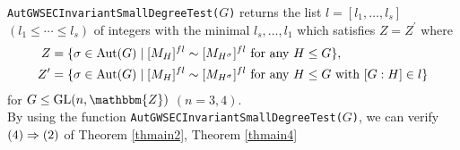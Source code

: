 \documentclass{amsart}
\theoremstyle{plain}
\theoremstyle{definition}
\theoremstyle{remark}
\newcommand{\bZ}{\mathbbm{Z}}\newcommand{\bQ}{\mathbbm{Q}}
\newcommand{\GL}{{\rm GL}}\newcommand{\SL}{{\rm SL}}
\begin{document}
\noindent
{\tt AutGWSECInvariantSmallDegreeTest(}$G${\tt )} 
returns the list $l=[l_1,\ldots,l_s]$ $(l_1\leq \cdots\leq l_s)$ 
of integers with the minimal $l_s,\ldots,l_1$ 
which satisfies $Z=Z^\prime$ 
where 
\begin{align*}
Z&=\{\sigma\in{\rm Aut}(G)\mid [M_H]^{fl}\sim [M_{H^\sigma}]^{fl}\ {\rm for}\ {\rm any}\ H\leq G\},\\
Z^\prime&=\{\sigma\in{\rm Aut}(G)\mid [M_H]^{fl}\sim [M_{H^\sigma}]^{fl}\ {\rm for}\ {\rm any}\ H\leq G\ {\rm with}\ [G:H]\in l\}
\end{align*}
for $G\leq \GL(n,\bZ)$ $(n=3,4)$.\\

By using the function 
{\tt AutGWSECInvariantSmallDegreeTest(}$G${\tt )}, we can verify  
${\rm (4)}\Rightarrow {\rm (2)}$
of {Theorem \ref{thmain2}}, 
{Theorem \ref{thmain4}} 
\end{document}
